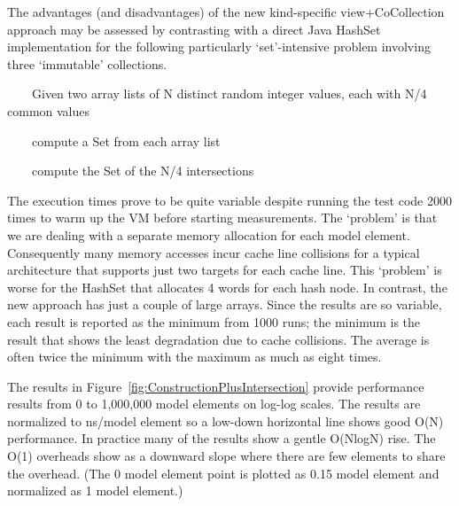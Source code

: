 \documentclass[
]{ceurart}
\begin{document}
The advantages (and disadvantages) of the new kind-specific view+CoCollection approach may be assessed by contrasting with a direct Java HashSet implementation for the following particularly `set'-intensive problem involving three `immutable' collections. 
\begin{description}[itemsep=-0.2cm]\vspace{-5pt}\begin{samepage}
\item ~~~~Given two array lists of N distinct random integer values, each with N/4 common values
\item ~~~~compute a Set from each array list
\item ~~~~compute the Set of the N/4 intersections
\end{samepage}\vspace{-5pt}\end{description}
The execution times prove to be quite variable despite running the test code 2000 times to warm up the VM before starting measurements. The `problem' is that we are dealing with a separate memory allocation for each model element. Consequently many memory accesses incur cache line collisions for a typical architecture that supports just two targets for each cache line. This `problem' is worse for the HashSet that allocates 4 words for each hash node. In contrast, the new approach has just a couple of large arrays. Since the results are so variable, each result is reported as the minimum from 1000 runs; the minimum is the result that shows the least degradation due to cache collisions. The average is often twice the minimum with the maximum as much as eight times.

The results in Figure~\ref{fig:ConstructionPlusIntersection} provide performance results from 0 to 1,000,000 model elements on log-log scales. The results are normalized to ns/model element so a low-down horizontal line shows good O(N) performance. In practice many of the results show a gentle O(NlogN) rise. The O(1) overheads show as a downward slope where there are few elements to share the overhead. (The 0 model element point is plotted as 0.15 model element and normalized as 1 model element.)
\end{document}
